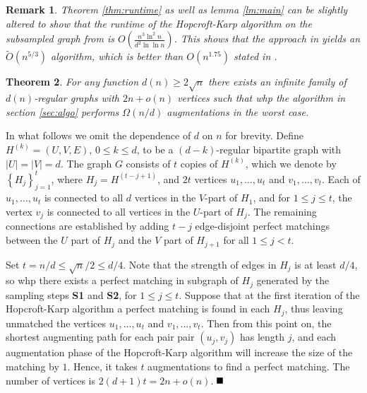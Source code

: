 \documentclass[11pt]{article}
\newcommand{\qed}{\mbox{}\hspace*{\fill}\nolinebreak\mbox{$\rule{0.6em}{0.6em}$}
}
\newtheorem{theorem}{Theorem}[section]
\newtheorem{remark}[theorem]{Remark}
\newenvironment{proof}{{\bf Proof:}}{$\qed$\par}
\begin{document}
\begin{remark}
Theorem \ref{thm:runtime} as well as lemma \ref{lm:main} can be slightly altered to show that the runtime of the Hopcroft-Karp algorithm on the subsampled graph from \cite{gkk:rbp08} is $O\left(\frac{n^3\ln^2 n}{d^2\ln \ln n}\right)$. This shows that the approach in \cite{gkk:rbp08} yields an $\tilde O(n^{5/3})$ algorithm, which is better than $O(n^{1.75})$ stated in \cite{gkk:rbp08}.
\end{remark}

\begin{theorem}\label{thm:lowerbound}
For any function $d(n)\geq 2\sqrt{n}$ there exists an infinite family of $d(n)$-regular graphs with $2n+o(n)$ vertices such that whp the algorithm in section \ref{sec:algo} performs $\Omega(n/d)$ augmentations in the worst case. 
\end{theorem}
\begin{proof}
 In what follows we omit the dependence of $d$ on $n$ for brevity. Define $H^{(k)}=(U, V, E)$, $0\leq k \leq d$, to be a $(d-k)$-regular bipartite graph with $|U|=|V|=d$.  The graph $G$ consists of $t$ copies of $H^{(k)}$, which we denote by $\left\lbrace H_j \right\rbrace_{j=1}^t$, where $H_j=H^{(t-j+1)}$, and $2t$ vertices $u_1,\ldots, u_t$ and $v_1, \ldots, v_t$. Each of $u_1,\ldots, u_t$ is connected to all $d$ vertices in the $V$-part of $H_1$, and 
 for  $1\leq j\leq t$, the vertex $v_j$  is connected to all vertices in the $U$-part of $H_j$. The remaining connections are established by adding $t-j$ edge-disjoint perfect matchings between the $U$ part of $H_j$ and the $V$ part of $H_{j+1}$ for all $1\leq j<t$.
 
 Set $t=n/d\leq \sqrt{n}/2\leq d/4$. Note that the strength of edges in $H_j$ is at least $d/4$, so whp there exists a perfect matching in subgraph of $H_j$ generated 
 by the sampling steps \textbf{S1} and \textbf{S2}, for $1 \le j \le t$. Suppose that at the first iteration of the Hopcroft-Karp algorithm a perfect matching is found in each $H_j$, thus leaving unmatched the vertices  $u_1,\ldots, u_t$ and $v_1, \ldots, v_t$.
 Then from this point on, the shortest augmenting path for each pair pair $(u_j, v_j)$ has length $j$, and each augmentation phase of the Hopcroft-Karp algorithm
 will increase the size of the matching by $1$. Hence, it takes $t$ augmentations to find a perfect matching. The number of vertices is $2(d+1)t=2n+o(n)$. 
\end{proof}
\end{document}
